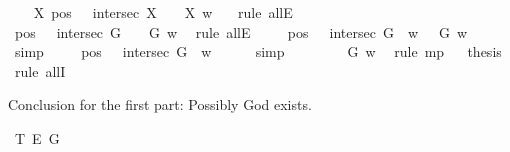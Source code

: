 \begin{isabellebody}
\ \ \isamarkupfalse%
\ {\isachardoublequoteopen}{\isacharparenleft}\isactrlbold {\isasymforall}X{\isachardot}\ {\isacharparenleft}{\isacharparenleft}pos\ {\isasymP}{\isacharparenright}\ \isactrlbold {\isasymand}\ {\isacharparenleft}intersec\ X\ {\isasymP}{\isacharparenright}{\isacharparenright}\ \isactrlbold {\isasymrightarrow}\ {\isasymP}\ X{\isacharparenright}\ w{\isachardoublequoteclose}\ \ \isamarkupfalse%
\ {\isacharparenleft}rule\ allE{\isacharparenright}\ \ \ \isanewline
\ \ \isamarkupfalse%
\ {\isachardoublequoteopen}{\isacharparenleft}{\isacharparenleft}{\isacharparenleft}pos\ {\isasymP}{\isacharparenright}\ \isactrlbold {\isasymand}\ {\isacharparenleft}intersec\ G\ {\isasymP}{\isacharparenright}{\isacharparenright}\ \isactrlbold {\isasymrightarrow}\ {\isasymP}\ G{\isacharparenright}\ w{\isachardoublequoteclose}\ \isamarkupfalse%
\ {\isacharparenleft}rule\ allE{\isacharparenright}\isanewline
\ \ \isamarkupfalse%
\ {}{\isacharcolon}\ {\isachardoublequoteopen}{\isacharparenleft}{\isacharparenleft}pos\ {\isasymP}\ \isactrlbold {\isasymand}\ intersec\ G\ {\isasymP}{\isacharparenright}\ w{\isacharparenright}\ {\isasymlongrightarrow}\ {\isasymP}\ G\ w{\isachardoublequoteclose}\ \isamarkupfalse%
\ simp\isanewline
\ \ \isamarkupfalse%
\ {}{\isacharcolon}\ {\isachardoublequoteopen}{\isacharparenleft}{\isacharparenleft}pos\ {\isasymP}{\isacharparenright}\ \isactrlbold {\isasymand}\ {\isacharparenleft}intersec\ G\ {\isasymP}{\isacharparenright}{\isacharparenright}\ w{\isachardoublequoteclose}\ \isamarkupfalse%
\ {}\ {}\ \isamarkupfalse%
\ simp\isanewline
\ \ \isamarkupfalse%
\ {}\ {}\ \isamarkupfalse%
\ {\isachardoublequoteopen}{\isasymP}\ G\ w{\isachardoublequoteclose}\ \isamarkupfalse%
\ {\isacharparenleft}rule\ mp{\isacharparenright}\isanewline
\isacommand{{\isacharbraceright}}\isamarkupfalse%
\ \isamarkupfalse%
\ {\isacharquery}thesis\ \isamarkupfalse%
\ {\isacharparenleft}rule\ allI{\isacharparenright}\isanewline
{}\isamarkupfalse%
%
%
%
%
\begin{isamarkuptext}%
Conclusion for the first part: Possibly God exists.%
\end{isamarkuptext}\isamarkuptrue%
\isamarkupfalse%
\ T{}{\isacharcolon}\ {\isachardoublequoteopen}{\isasymlfloor}\isactrlbold {\isasymdiamond}\isactrlbold {\isasymexists}\isactrlsup E\ G{\isasymrfloor}{\isachardoublequoteclose}%

\end{isabellebody}
